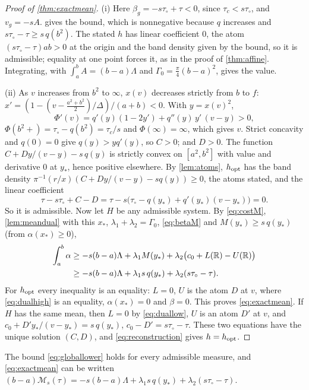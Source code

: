 \begin{proof}[Proof of \cref{thm:exactmean}]
(i) Here $\beta_g=-s\tau_\circ+\tau<0$, since $\tau_c<s\tau_\circ$, and
$v_g=-sA$.  gives the bound, which is nonnegative because
$q$ increases and $s\tau_\circ-\tau\ge s\,q(b^2)$. The stated $h$ has linear
coefficient $0$, the atom $(s\tau_\circ-\tau)ab>0$ at the origin and the
band density given by the bound, so it is admissible; equality at one point
forces it, as in the proof of \cref{thm:affine}. Integrating, with
$\int_a^bA=(b-a)\Lambda$ and $\Gamma_0=\frac\pi4(b-a)^2$, gives the value.

(ii) As $v$ increases from $b^2$ to $\infty$, $x(v)$ decreases strictly from
$b$ to $f$: $x'=(1-(v-\frac{a^2+b^2}2)/\Delta)/(a+b)<0$. With $y=x(v)^2$,
\[
\Phi'(v)=q'(y)(1-2y')+q''(y)\,y'\,(v-y)>0,
\]
$\Phi(b^2+)=\tau_\circ-q(b^2)=\tau_c/s$ and $\Phi(\infty)=\infty$, which gives
$v$. Strict concavity and $q(0)=0$ give $q(y)>yq'(y)$, so $C>0$; and $D>0$.
The function $C+Dy/(v-y)-s\,q(y)$ is strictly convex on $[a^2,b^2]$ with
value and derivative $0$ at $y_*$, hence positive elsewhere. By
\cref{lem:atoms}, $h_{\rm opt}$ has the band density
$\pi^{-1}(r/x)(C+Dy/(v-y)-sq(y))\ge0$, the atoms stated, and the linear
coefficient
\[
\tau-s\tau_\circ+C-D=\tau-s\big(\tau_\circ-q(y_*)+q'(y_*)(v-y_*)\big)=0 .
\]
So it is admissible. Now let $H$ be any admissible system. By
\eqref{eq:costM}, \cref{lem:meandual} with this $x_*$, $\lambda_1+\lambda_2=\Gamma_0$,
\eqref{eq:betaM} and $M(y_*)\ge s\,q(y_*)$ (from $\alpha(x_*)\ge0$),
\begin{align}
\int_a^b\alpha&\ge-s(b-a)\Lambda+\lambda_1M(y_*)+\lambda_2\big(c_0+L(\mathbb R)-U(\mathbb R)\big)\notag\\
&\ge-s(b-a)\Lambda+\lambda_1s\,q(y_*)+\lambda_2(s\tau_\circ-\tau).\label{eq:globallower}
\end{align}
For $h_{\rm opt}$ every inequality is an equality: $L=0$, $U$ is the atom
$D$ at $v$, where \eqref{eq:dualhigh} is an equality, $\alpha(x_*)=0$ and
$\beta=0$. This proves \eqref{eq:exactmean}. If $H$ has the same mean, then
$L=0$ by \eqref{eq:duallow}, $U$ is an atom $D'$ at $v$, and
$c_0+D'y_*/(v-y_*)=s\,q(y_*)$, $c_0-D'=s\tau_\circ-\tau$. These two equations
have the unique solution $(C,D)$, and \eqref{eq:reconstruction} gives
$h=h_{\rm opt}$.
\end{proof}

The bound \eqref{eq:globallower} holds for every admissible measure, and
\eqref{eq:exactmean} can be written
$(b-a)\mathcal M_s(\tau)=-s(b-a)\Lambda+\lambda_1s\,q(y_*)+\lambda_2(s\tau_\circ-\tau)$.

